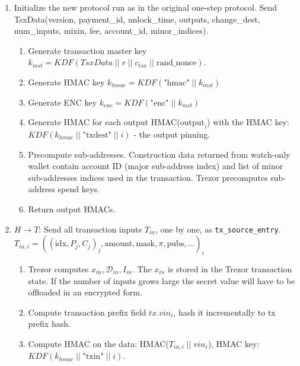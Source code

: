 \documentclass[]{article}
\begin{document}
\begin{enumerate}
	\item Initialize the new protocol run as in the original one-step protocol. Send TsxData(version, payment\_id, unlock\_time, outputs, change\_dest, num\_inputs, mixin, fee, account\_id, minor\_indices).
	\begin{enumerate}
		\item Generate transaction master key $k_{mst} =  \textit{KDF}(TsxData \; || \; r \; || \; c_{tsx} \; || \; \text{rand\_nonce})$.
		
		\item Generate HMAC key $k_{hmac} = \textit{KDF}\left(\text{"hmac"} \; || \; k_{mst}\right)$
		
		\item Generate ENC key $k_{enc} = \textit{KDF}\left(\text{"enc"} \; || \; k_{mst}\right)$

		\item Generate HMAC for each output HMAC($\text{output}_i$) with the HMAC key: $\textit{KDF}(k_{hmac} \; || \; \text{"txdest"} \; || \; i)$ - the output pinning.
		
		\item Precompute sub-addresses. Construction data returned from watch-only wallet contain account ID (major sub-address index) and list of minor sub-addresses indices used in the transaction. Trezor precomputes sub-address spend keys.
		
		\item Return output HMACs.
	\end{enumerate} 

	\item $H \rightarrow T$: Send all transaction inputs $T_{in}$, one by one, as \verb|tx_source_entry|.\\
	$T_{in,i} = ((\text{idx}, P_j,C_j)_j, \text{amount}, \text{mask}, \pi, \text{pubs}, \dots)_i$
	\begin{enumerate}
		\item Trezor computes $x_{in}, \mathcal{D}_{in}, I_{in}$. The $x_{in}$ is stored in the Trezor transaction state. 
		If the number of inputs grows large the secret value 
		will have to be offloaded in an encrypted form.
		
		\item Compute transaction prefix field $tx.vin_i$, hash it incrementally to tx prefix hash.
		
		\item Compute HMAC on the data: HMAC($T_{in,i} \; || \; vin_i$), HMAC key: $\textit{KDF}(k_{hmac} \; || \; \text{"txin"} \; || \; i)$.
		

\end{enumerate}
\end{enumerate}
\end{document}
